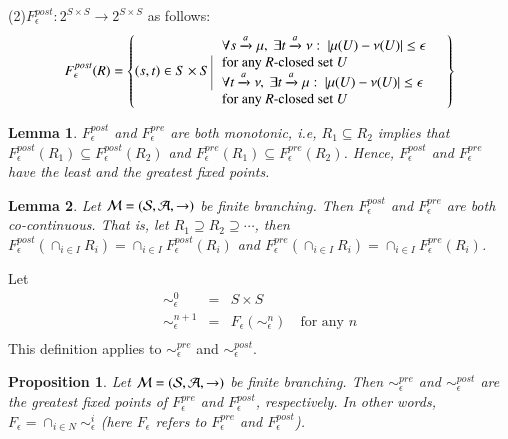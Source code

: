 \documentclass[contract,10pt]{elsarticle}
\newtheorem{prop}{Proposition}
\newtheorem{lemm}{Lemma}
\newenvironment{proposition}{\begin{prop} \rm }{\end{prop}}
\newenvironment{lemma}{\begin{lemm} \rm }{\end{lemm}}
\begin{document}
(2)$F^{post}_{\epsilon}:2^{S\times S}\rightarrow 2^{S\times S}$ as follows:
 \label{eq:defF}
$$F^{post}_{\epsilon}(R)=\left\{(s,t)\in S\times S \put(2,-11){\line(0,1){25.0}}
\hspace{-0.2cm}\begin{array}{lll}
&\forall s\xrightarrow{a} \mu,~\exists t\xrightarrow{a}\nu:~ |\mu(U)-\nu(U)|\leq \epsilon&\\
&\mbox{for any $R$-closed set $U$}&\\
&\forall t\xrightarrow{a} \nu,~\exists t\xrightarrow{a}\mu:~ |\mu(U)-\nu(U)|\leq \epsilon&\\
&\mbox{for any $R$-closed set $U$}&

\end{array}
\right\}
$$

\begin{lemma} $F^{post}_{\epsilon}$ and $F^{pre}_{\epsilon}$ are both monotonic, i.e, $R_1\subseteq R_2$ implies that $F^{post}_{\epsilon}(R_1)\subseteq F^{post}_{\epsilon}(R_2)$ and $F^{pre}_{\epsilon}(R_1)\subseteq F^{pre}_{\epsilon}(R_2)$. Hence, $F^{post}_{\epsilon}$ and $F^{pre}_{\epsilon}$ have the least and the greatest fixed points.
\end{lemma}

\begin{lemma}  Let $\cal {M}=(S,A,\rightarrow)$ be finite branching. Then $F^{post}_{\epsilon}$ and $F^{pre}_{\epsilon}$ are both co-continuous. That is, let $R_{1}\supseteq R_2\supseteq \cdots$, then $F^{post}_{\epsilon}(\cap_{i\in I}R_i)=\cap_{i\in I}F^{post}_{\epsilon}(R_i)$ and $F^{pre}_{\epsilon}(\cap_{i\in I}R_i)=\cap_{i\in I}F^{pre}_{\epsilon}(R_i)$.
\end{lemma}

Let
$$
\begin{array}{lll}
\sim^{0}_{\epsilon}&=& S\times S\\
\sim^{n+1}_{\epsilon}&=&F_{\epsilon}(\sim^{n}_{\epsilon})\quad \mbox{for any $n$}\\
\end{array}
$$
This definition  applies to $\sim^{pre}_{\epsilon}$ and $\sim^{post}_{\epsilon}$.

\begin{proposition} Let $\cal {M}=(S,A,\rightarrow)$ be finite branching. Then $\sim^{pre}_{\epsilon}$ and  $\sim^{post}_{\epsilon}$  are the greatest fixed points of $F^{pre}_{\epsilon}$ and $F^{post}_{\epsilon}$, respectively.
In other words, $F_{\epsilon}=\cap_{i\in N}\sim^{i}_{\epsilon}$ (here $F_{\epsilon}$ refers to $F^{pre}_{\epsilon}$ and $F^{post}_{\epsilon}$).

\end{proposition}
\end{document}
